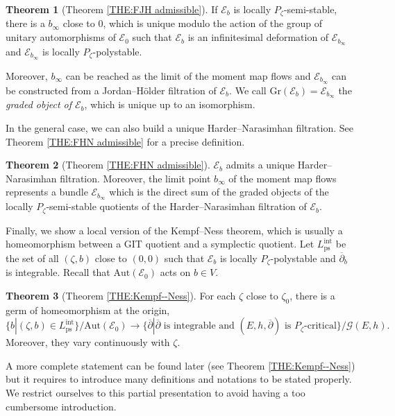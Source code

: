 \documentclass{article}
\theoremstyle{remark}
\theoremstyle{definition}
\newtheorem{theoremIntro}{Theorem}
\newcommand{\Aut}{\mathrm{Aut}}
\newcommand{\E}{\mathcal{E}}
\newcommand{\G}{\mathcal{G}}
\newcommand{\dbar}{\overline{\partial}}
\begin{document}
\begin{theoremIntro}[Theorem \ref{THE:FJH admissible}]\label{THE:6}
    If $\E_b$ is locally $P_\zeta$-semi-stable, there is a $b_\infty$ close to $0$, which is unique modulo the action of the group of unitary automorphisms of $\E_0$ such that $\E_b$ is an infinitesimal deformation of $\E_{b_\infty}$ and $\E_{b_\infty}$ is locally $P_\zeta$-polystable.
    
    Moreover, $b_\infty$ can be reached as the limit of the moment map flows and $\E_{b_\infty}$ can be constructed from a Jordan--Hölder filtration of $\E_b$. We call $\mathrm{Gr}(\E_b) = \E_{b_\infty}$ the \textit{graded object of $\E_b$}, which is unique up to an isomorphism.
\end{theoremIntro}

In the general case, we can also build a unique Harder--Narasimhan filtration. See Theorem \ref{THE:FHN admissible} for a precise definition.

\begin{theoremIntro}[Theorem \ref{THE:FHN admissible}]\label{THE:7}
    $\E_b$ admits a unique Harder--Narasimhan filtration. Moreover, the limit point $b_\infty$ of the moment map flows represents a bundle $\E_{b_\infty}$ which is the direct sum of the graded objects of the locally $P_\zeta$-semi-stable quotients of the Harder--Narasimhan filtration of $\E_b$.
\end{theoremIntro}

Finally, we show a local version of the Kempf--Ness theorem, which is usually a homeomorphism between a GIT quotient and a symplectic quotient. Let $L_{\mathrm{ps}}^{\mathrm{int}}$ be the set of all $(\zeta,b)$ close to $(0,0)$ such that $\E_b$ is locally $P_\zeta$-polystable and $\dbar_b$ is integrable. Recall that $\Aut(\E_0)$ acts on $b \in V$.

\begin{theoremIntro}[Theorem \ref{THE:Kempf--Ness}]\label{THE:8}
    For each $\zeta$ close to $\zeta_0$, there is a germ of homeomorphism at the origin,
    $$
    \{b|(\zeta,b) \in L_{\mathrm{ps}}^{\mathrm{int}}\}/\Aut(\E_0) \longrightarrow \{\dbar|\dbar \textrm{ is integrable and }(E,h,\dbar) \textrm{ is $P_\zeta$-critical}\}/\G(E,h).
    $$
    Moreover, they vary continuously with $\zeta$.
\end{theoremIntro}

A more complete statement can be found later (see Theorem \ref{THE:Kempf--Ness}) but it requires to introduce many definitions and notations to be stated properly. We restrict ourselves to this partial presentation to avoid having a too cumbersome introduction.
\end{document}
